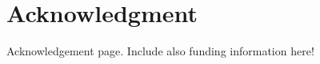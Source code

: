 \chapter*{Acknowledgment}
\vspace{5 mm}

% 
Acknowledgement page. Include also funding information here!
% 
